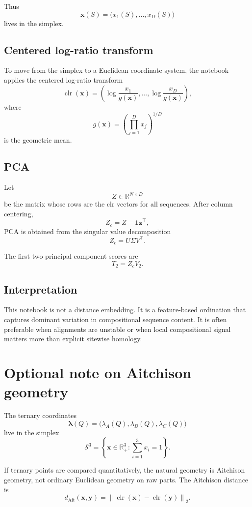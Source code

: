 \documentclass[11pt,a4paper]{article}
\begin{document}
Thus
\[
\bm{x}(S)=\big(x_1(S),\dots,x_D(S)\big)
\]
lives in the simplex.

\subsection{Centered log-ratio transform}

To move from the simplex to a Euclidean coordinate system, the notebook applies the centered log-ratio transform
\[
\operatorname{clr}(\bm{x})=
\left(
\log\frac{x_1}{g(\bm{x})},
\dots,
\log\frac{x_D}{g(\bm{x})}
\right),
\]
where
\[
g(\bm{x})=\left(\prod_{j=1}^{D}x_j\right)^{1/D}
\]
is the geometric mean.

\subsection{PCA}

Let
\[
Z\in\mathbb{R}^{N\times D}
\]
be the matrix whose rows are the clr vectors for all sequences. After column centering,
\[
Z_c=Z-\bm{1}\bar{\bm{z}}^\top,
\]
PCA is obtained from the singular value decomposition
\[
Z_c=U\Sigma V^\top.
\]

The first two principal component scores are
\[
T_2=Z_cV_2.
\]

\subsection{Interpretation}

This notebook is not a distance embedding. It is a feature-based ordination that captures dominant variation in compositional sequence content. It is often preferable when alignments are unstable or when local compositional signal matters more than explicit sitewise homology.

\section{Optional note on Aitchison geometry}

The ternary coordinates
\[
\bm{\lambda}(Q)=\big(\lambda_A(Q),\lambda_B(Q),\lambda_C(Q)\big)
\]
live in the simplex
\[
\mathcal{S}^3=\left\{\bm{x}\in\mathbb{R}_+^3:\sum_{i=1}^{3}x_i=1\right\}.
\]

If ternary points are compared quantitatively, the natural geometry is Aitchison geometry, not ordinary Euclidean geometry on raw parts. The Aitchison distance is
\[
d_{\mathrm{Ait}}(\bm{x},\bm{y})
=\left\|\operatorname{clr}(\bm{x})-\operatorname{clr}(\bm{y})\right\|_2.
\]
\end{document}
